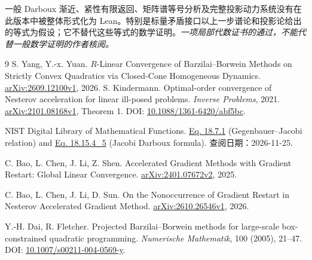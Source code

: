 \documentclass[11pt,a4paper,UTF8,fontset=fandol]{ctexart}
\theoremstyle{remark}\newtheorem{remark}[theorem]{说明}
\begin{document}
一般 Darboux 渐近、紧性有限返回、矩阵谱等号分析及完整投影动力系统没有在此版本中被整体形式化为 Lean。特别是标量矛盾接口以上一步谱论和投影论给出的等式为假设；它不替代这些等式的数学证明。\emph{一项局部代数证书的通过，不能代替一般数学证明的作者核阅。}

\begin{thebibliography}{9}
S. Yang, Y.-x. Yuan.
$R$-Linear Convergence of Barzilai--Borwein Methods on Strictly Convex Quadratics via Closed-Cone Homogeneous Dynamics.
\href{https://arxiv.org/abs/2609.12100v1}{arXiv:2609.12100v1}, 2026.
S. Kindermann.
Optimal-order convergence of Nesterov acceleration for linear ill-posed problems.
\emph{Inverse Problems}, 2021.
\href{https://arxiv.org/abs/2101.08168v1}{arXiv:2101.08168v1}, Theorem 1.
DOI: \href{https://doi.org/10.1088/1361-6420/abf5bc}{10.1088/1361-6420/abf5bc}.

NIST Digital Library of Mathematical Functions.
\href{https://dlmf.nist.gov/18.7.E1}{Eq. 18.7.1}
(Gegenbauer--Jacobi relation) and
\href{https://dlmf.nist.gov/18.15.E4_5}{Eq. 18.15.4\_5}
(Jacobi Darboux formula). 查阅日期：2026-11-25.

C. Bao, L. Chen, J. Li, Z. Shen.
Accelerated Gradient Methods with Gradient Restart: Global Linear Convergence.
\href{https://arxiv.org/abs/2401.07672v2}{arXiv:2401.07672v2}, 2025.

C. Bao, L. Chen, J. Li, D. Sun.
On the Nonoccurrence of Gradient Restart in Nesterov Accelerated Gradient Method.
\href{https://arxiv.org/abs/2610.26546v1}{arXiv:2610.26546v1}, 2026.

Y.-H. Dai, R. Fletcher.
Projected Barzilai--Borwein methods for large-scale box-constrained quadratic programming.
\emph{Numerische Mathematik}, 100 (2005), 21--47.
DOI: \href{https://doi.org/10.1007/s00211-004-0569-y}{10.1007/s00211-004-0569-y}.
\end{thebibliography}
\end{document}
